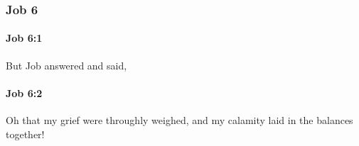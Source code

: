 	\subsubsection{Job 6} %
		\label{JOB-6}

		\paragraph{Job 6:1} %
			\label{JOB-6-1}

			But Job answered and said,


		\paragraph{Job 6:2} %
			\label{JOB-6-2}

			Oh that my grief were throughly weighed, and my calamity laid in the balances together!


